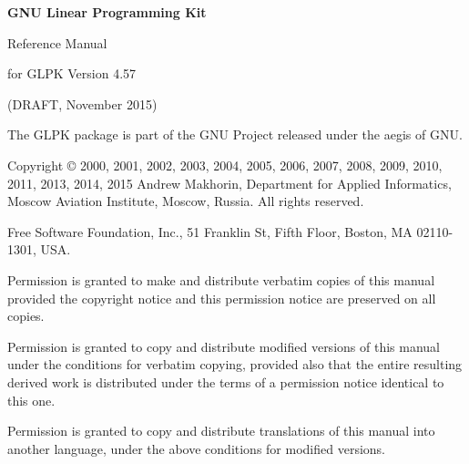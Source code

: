 \documentclass[11pt]{report}
\begin{document}
\thispagestyle{empty}

\begin{center}

\vspace*{1.5in}

\begin{huge}
\sf\bfseries GNU Linear Programming Kit
\end{huge}

\vspace{0.5in}

\begin{LARGE}
\sf Reference Manual
\end{LARGE}

\vspace{0.5in}

\begin{LARGE}
\sf for GLPK Version 4.57
\end{LARGE}

\vspace{0.5in}
\begin{Large}
\sf (DRAFT, November 2015)
\end{Large}
\end{center}

\newpage

\vspace*{1in}

\vfill

\noindent
The GLPK package is part of the GNU Project released under the aegis of
GNU.

\noindent
Copyright \copyright{} 2000, 2001, 2002, 2003, 2004, 2005, 2006, 2007,
2008, 2009, 2010, 2011, 2013, 2014, 2015 Andrew Makhorin, Department
for Applied Informatics, Moscow Aviation Institute, Moscow, Russia. All
rights reserved.

\noindent
Free Software Foundation, Inc., 51 Franklin St, Fifth Floor, Boston, MA
02110-1301, USA.

\noindent
Permission is granted to make and distribute verbatim copies of this
manual provided the copyright notice and this permission notice are
preserved on all copies.

\noindent
Permission is granted to copy and distribute modified versions of this
manual under the conditions for verbatim copying, provided also that
the entire resulting derived work is distributed under the terms of
a permission notice identical to this one.

\noindent
Permission is granted to copy and distribute translations of this
manual into another language, under the above conditions for modified
versions.
\end{document}
